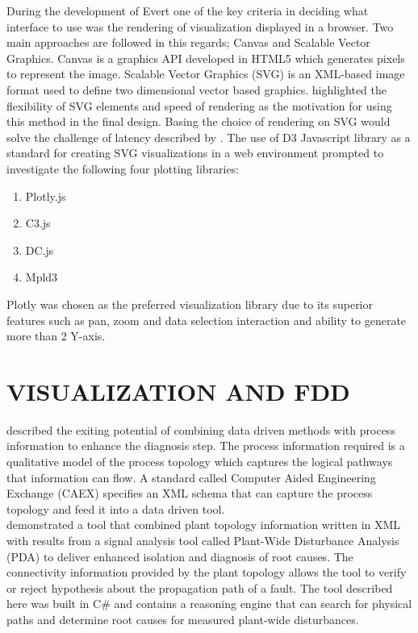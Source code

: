During the development of Evert one of the key criteria in deciding what interface to use was the rendering of visualization displayed in a browser. Two main approaches are followed in this regards; Canvas and Scalable Vector Graphics. Canvas is a graphics API developed in HTML5 which generates pixels to represent the image. Scalable Vector Graphics (SVG) is an XML-based image format used to define two dimensional vector based graphics. \cite{Herbst2017} highlighted the flexibility of SVG elements and speed of rendering as the motivation for using this method in the final design. Basing the choice of rendering on SVG would solve the challenge of latency described by \cite{ali2016big}. The use of D3 Javascript library as a standard for creating SVG visualizations in a web environment prompted  \cite{Herbst2017} to investigate the following four plotting libraries:
\begin{enumerate}
	\item Plotly.js
	\item C3.js
	\item DC.js
	\item Mpld3
\end{enumerate}
Plotly was chosen as the preferred visualization library due to its superior features such as pan, zoom and data selection interaction and ability to generate more than 2 Y-axis.


\section{VISUALIZATION AND FDD}

\cite{thornhill2007advances} described the exiting potential of combining data driven methods with process information to enhance the diagnosis step. The process information required is a qualitative model of the process topology which captures the logical pathways that information can flow. A standard called Computer Aided Engineering Exchange (CAEX) specifies an XML schema that can capture the process topology and feed it into a data driven tool.\\

\cite{yim2006using} demonstrated a tool that combined plant topology information written in XML with results from a signal analysis tool called Plant-Wide Disturbance Analysis (PDA) to deliver enhanced isolation and diagnosis of root causes. The connectivity information provided by the plant topology allows the tool to verify or reject hypothesis about the propagation path of a fault. The tool described here was built in C\# and contains a reasoning engine that can search for physical paths and determine root causes for measured plant-wide disturbances.\\

